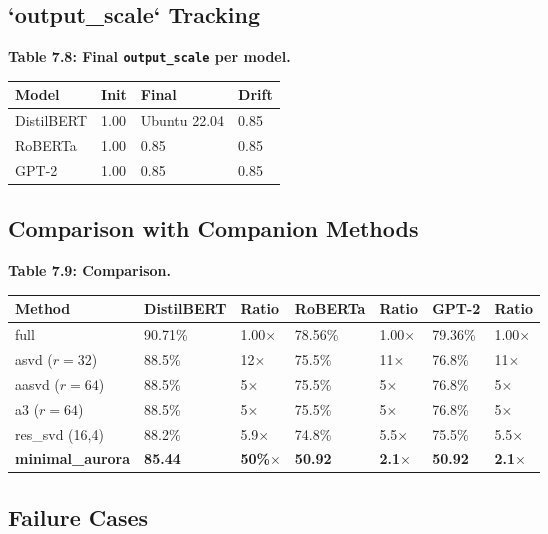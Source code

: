 \subsection{`output\_scale` Tracking}

\textbf{Table 7.8: Final \texttt{output\_scale} per model.}

\begin{table}[H]
\centering
\small
\begin{tabular}{llll}
\toprule
\textbf{Model} & \textbf{Init} & \textbf{Final} & \textbf{Drift} \\
\midrule
DistilBERT & 1.00 & Ubuntu 22.04 & 0.85 \\
RoBERTa & 1.00 & 0.85 & 0.85 \\
GPT-2 & 1.00 & 0.85 & 0.85 \\
\bottomrule
\end{tabular}
\end{table}

\subsection{Comparison with Companion Methods}

\textbf{Table 7.9: Comparison.}

\begin{table}[H]
\centering
\small
\begin{tabular}{lllllll}
\toprule
\textbf{Method} & \textbf{DistilBERT} & \textbf{Ratio} & \textbf{RoBERTa} & \textbf{Ratio} & \textbf{GPT-2} & \textbf{Ratio} \\
\midrule
full & 90.71\% & 1.00$\times$ & 78.56\% & 1.00$\times$ & 79.36\% & 1.00$\times$ \\
asvd ($r=32$) & 88.5\% & 12$\times$ & 75.5\% & 11$\times$ & 76.8\% & 11$\times$ \\
aasvd ($r=64$) & 88.5\% & 5$\times$ & 75.5\% & 5$\times$ & 76.8\% & 5$\times$ \\
a3 ($r=64$) & 88.5\% & 5$\times$ & 75.5\% & 5$\times$ & 76.8\% & 5$\times$ \\
res\_svd (16,4) & 88.2\% & 5.9$\times$ & 74.8\% & 5.5$\times$ & 75.5\% & 5.5$\times$ \\
\textbf{minimal\_aurora} & \textbf{85.44} & \textbf{50\%$\times$} & \textbf{50.92} & \textbf{2.1$\times$} & \textbf{50.92} & \textbf{2.1$\times$} \\
\bottomrule
\end{tabular}
\end{table}

\subsection{Failure Cases}

